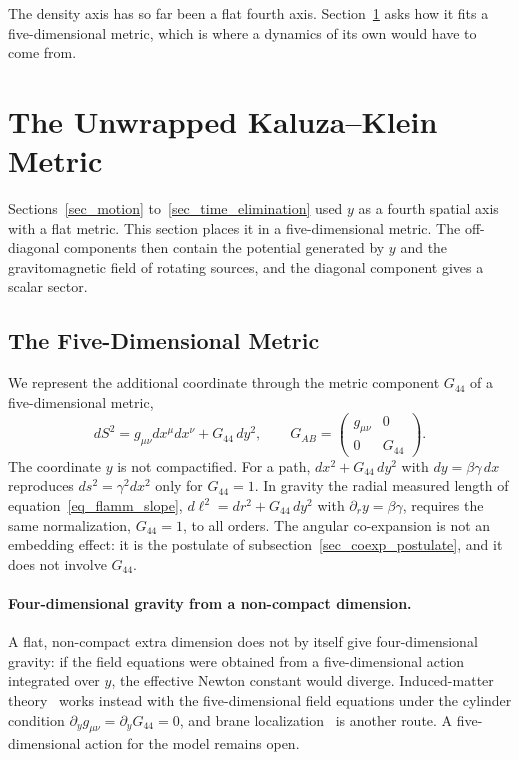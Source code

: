 \documentclass{iopjournal}
\begin{document}
The density axis has so far been a flat fourth axis. Section~\ref{sec_kk} asks how it fits a five-dimensional metric, which is where a dynamics of its own would have to come from.
\section{The Unwrapped Kaluza--Klein Metric}\label{sec_kk}

Sections~\ref{sec_motion} to~\ref{sec_time_elimination} used $y$ as a fourth spatial axis with a flat metric. This section places it in a five-dimensional metric. The off-diagonal components then contain the potential generated by $y$ and the gravitomagnetic field of rotating sources, and the diagonal component gives a scalar sector.

\subsection{The Five-Dimensional Metric}

We represent the additional coordinate through the metric component $G_{44}$ of a five-dimensional metric,
\begin{equation}\label{eq_kk_line_element}
    dS^2=g_{\mu\nu}dx^\mu dx^\nu+G_{44}\,dy^2,
    \qquad
    G_{AB}=\begin{pmatrix} g_{\mu\nu} & 0\\ 0 & G_{44}\end{pmatrix}.
\end{equation}
The coordinate $y$ is not compactified. For a path, $dx^2+G_{44}\,dy^2$ with $dy=\beta\gamma\,dx$ reproduces $ds^2=\gamma^2dx^2$ only for $G_{44}=1$. In gravity the radial measured length of equation~\eqref{eq_flamm_slope}, $d\ell^2=dr^2+G_{44}\,dy^2$ with $\partial_ry=\beta\gamma$, requires the same normalization, $G_{44}=1$, to all orders. The angular co-expansion is not an embedding effect: it is the postulate of subsection~\ref{sec_coexp_postulate}, and it does not involve $G_{44}$.

\paragraph{Four-dimensional gravity from a non-compact dimension.} A flat, non-compact extra dimension does not by itself give four-dimensional gravity: if the field equations were obtained from a five-dimensional action integrated over $y$, the effective Newton constant would diverge. Induced-matter theory~\cite{Wesson1999STM,OverduinWesson1997} works instead with the five-dimensional field equations under the cylinder condition $\partial_y g_{\mu\nu}=\partial_y G_{44}=0$, and brane localization~\cite{RandallSundrum1999} is another route. A five-dimensional action for the model remains open.
\end{document}

